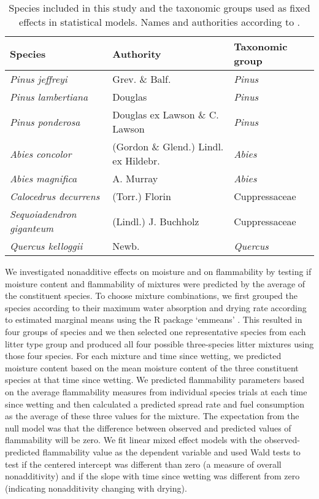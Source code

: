 \documentclass[letterpaper,12pt]{article}
\begin{document}
\begin{table}
  \caption{Species included in this study and the taxonomic groups used as fixed effects in statistical models. Names and authorities according to \citet{Jepson:2020}.
  \label{tab:species}}
\centering
\begin{tabular}{lll}
  \toprule
  Species & Authority & Taxonomic group \\
  \midrule
    \emph{Pinus jeffreyi}    & Grev. \& Balf.  & \emph{Pinus}\\
    \emph{Pinus lambertiana} & Douglas          & \emph{Pinus} \\
    \emph{Pinus ponderosa}   &  Douglas ex Lawson \& C. Lawson & \emph{Pinus} \\
    \emph{Abies concolor}    & (Gordon \& Glend.) Lindl. ex Hildebr. & \emph{Abies} \\
    \emph{Abies magnifica}   & A. Murray   & \emph{Abies} \\
    \emph{Calocedrus decurrens} & (Torr.) Florin & Cuppressaceae \\
    \emph{Sequoiadendron giganteum} & (Lindl.) J. Buchholz & Cuppressaceae \\
    \emph{Quercus kelloggii}    & Newb. & \emph{Quercus}\\ 
  \bottomrule
\end{tabular}
\end{table}


We investigated nonadditive effects on moisture and on flammability by
testing if moisture content and flammability of mixtures were predicted by the
average of the constituent species. To choose mixture combinations, we first
grouped the species according to their maximum water absorption and drying rate
according to estimated marginal means using the R package `emmeans'
\citep{Lenth-2019}. This resulted in four groups of species and we then
selected one representative species from each litter type group and produced
all four possible three-species litter mixtures using those four species. For
each mixture and time since wetting, we predicted moisture content based on the
mean moisture content of the three constituent species at that time since
wetting. We predicted flammability parameters based on the average flammability
measures from individual species trials at each time since wetting and then
calculated a predicted spread rate and fuel consumption as the average of these
three values for the mixture. The expectation from the null model was that the
difference between observed and predicted values of flammability will be zero.
We fit linear mixed effect models with the observed-predicted flammability
value as the dependent variable and used Wald tests to test if the centered
intercept was different than zero (a measure of overall nonadditivity) and if
the slope with time since wetting was different from zero (indicating
nonadditivity changing with drying).
\end{document}
